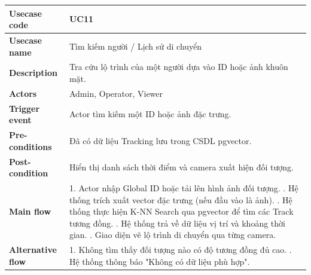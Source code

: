 \documentclass[12pt,a4paper]{article}
\begin{document}
\begin{table}[H]
\centering
\begin{tabular}{|l|p{12cm}|}
\hline
\textbf{Usecase code} & UC11 \\ \hline
\textbf{Usecase name} & Tìm kiếm người / Lịch sử di chuyển \\ \hline
\textbf{Description} & Tra cứu lộ trình của một người dựa vào ID hoặc ảnh khuôn mặt. \\ \hline
\textbf{Actors} & Admin, Operator, Viewer \\ \hline
\textbf{Trigger event} & Actor tìm kiếm một ID hoặc ảnh đặc trưng. \\ \hline
\textbf{Pre-conditions} & Đã có dữ liệu Tracking lưu trong CSDL pgvector. \\ \hline
\textbf{Post-condition} & Hiển thị danh sách thời điểm và camera xuất hiện đối tượng. \\ \hline
\textbf{Main flow} & 
1. Actor nhập Global ID hoặc tải lên hình ảnh đối tượng. \newline
2. Hệ thống trích xuất vector đặc trưng (nếu đầu vào là ảnh). \newline
3. Hệ thống thực hiện K-NN Search qua pgvector để tìm các Track tương đồng. \newline
4. Hệ thống trả về dữ liệu vị trí và khoảng thời gian. \newline
5. Giao diện vẽ lộ trình di chuyển qua từng camera. \\ \hline
\textbf{Alternative flow} & 
1. Không tìm thấy đối tượng nào có độ tương đồng đủ cao. \newline
2. Hệ thống thông báo "Không có dữ liệu phù hợp". \\ \hline
\end{tabular}
\end{table}
\end{document}
